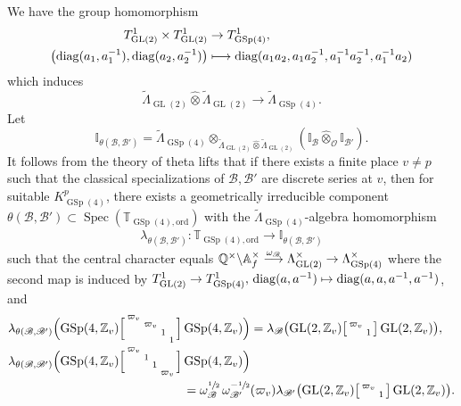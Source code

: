 \documentclass[JEP,XML,SOM,Unicode,published]{cedram}
\newenvironment{smallbmatrix}{\big[\begin{smallmatrix}}{\end{smallmatrix}\big]}
\newenvironment{Smallbmatrix}{\Big[\begin{smallmatrix}}{\end{smallmatrix}\Big]}
\newcommand\mto{\mathchoice{\longmapsto}{\mapsto}{\mapsto}{\mapsto}}
\newcommand\To[1]{\mathchoice{\xrightarrow{\textstyle\kern4pt#1\kern3pt}}{\stackrel{#1}{\longrightarrow}}{}{}}
\theoremstyle{plain}
\theoremstyle{remark}
\newcommand{\bA}{\mathbb{A}}
\newcommand{\bI}{\mathbb{I}}
\newcommand{\bQ}{\mathbb{Q}}
\newcommand{\bT}{\mathbb{T}}
\newcommand{\bZ}{\mathbb{Z}}
\newcommand{\cO}{\mathcal{O}}
\newcommand{\sB}{\mathscr{B}}
\DeclareMathOperator{\GL}{GL}
\DeclareMathOperator{\GSp}{GSp}
\newcommand{\diag}{\mathrm{diag}}
\newcommand{\ord}{\mathrm{ord}}
\DeclareMathOperator{\Spec}{Spec}
\let\wt\widetilde
\begin{document}
We have the group homomorphism
\begin{align*}
T^1_{\GL(2)}\times T^1_{\GL(2)}&\to T^1_{\GSp(4)},\\
\bigl(\diag(a_1,a^{-1}_1),\diag(a_2,a^{-1}_2)\bigr)&\mto \diag(a_1a_2,a_1a^{-1}_2,a^{-1}_1a^{-1}_2,a^{-1}_1a_2)
\end{align*}
which induces
\[
\wt{\Lambda}_{\GL(2)}\hat{\otimes}\wt{\Lambda}_{\GL(2)} \to \wt{\Lambda}_{\GSp(4)}.
\]
Let
\[
\bI_{\theta(\sB,\sB')}= \wt{\Lambda}_{\GSp(4)}\otimes_{\wt{\Lambda}_{\GL(2)}\hat{\otimes}\wt{\Lambda}_{\GL(2)}} (\bI_{\sB}\hat{\otimes}_{\cO}\bI_{\sB'}).
\]
It follows from the theory of theta lifts \cite{RobGlobalTheta} that if there exists a finite place $v\neq p$ such that the classical specializations of $\sB,\sB'$ are discrete series at $v$, then
for suitable $K^p_{\GSp(4)}$, there exists a geometrically irreducible component $\theta(\sB,\sB')\subset \Spec(\bT_{\GSp(4),\ord})$ with the $\wt{\Lambda}_{\GSp(4)}$-algebra homomorphism
\begin{align*}
\lambda_{\theta(\sB,\sB')}:\bT_{\GSp(4),\ord}\to \bI_{\theta(\sB,\sB')}
\end{align*}
such that the central character equals $\bQ^\times\backslash\bA^\times_f\To{\omega_{\sB}}\Lambda^\times_{\GL(2)}\to \Lambda^\times_{\GSp(4)}$ where the second map is induced by $T^1_{\GL(2)}\to T^1_{\GSp(4)}, \,\diag(a,a^{-1})\mto \diag(a,a,a^{-1},a^{-1})$, and
\begin{align*}
\lambda_{\theta(\sB,\sB')} \Bigl(\GSp(4,\bZ_v)\begin{Smallbmatrix}\varpi_v\\ &\varpi_v\\&&1\\&&&1\end{Smallbmatrix}\GSp(4,\bZ_v) \Bigr)
&=\lambda_{\sB}\bigl(\GL(2,\bZ_v)\begin{smallbmatrix}\varpi_v\\&1\end{smallbmatrix}\GL(2,\bZ_v)\bigr),\\
\lambda_{\theta(\sB,\sB')}\Bigl(\GSp(4,\bZ_v)\begin{Smallbmatrix}\varpi_v\\ &1\\&&1\\&&&\varpi_v\end{Smallbmatrix}\GSp(4,\bZ_v)\Bigr)\\
=\omega^{\sfrac{1}{2}}_{\sB}\,\omega^{-\sfrac{1}{2}}_{\sB'}&(\varpi_v)\lambda_{\sB'}\bigl(\GL(2,\bZ_v)\begin{smallbmatrix}\varpi_v\\&1\end{smallbmatrix}\GL(2,\bZ_v)\bigr).
\end{align*}
\end{document}
